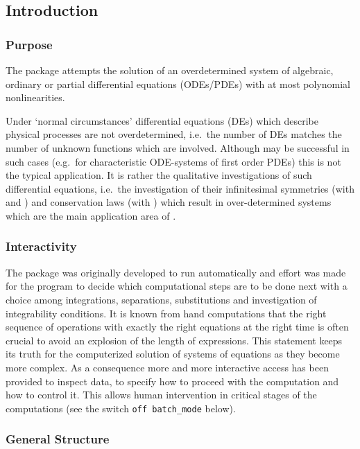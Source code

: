 \subsection{Introduction}

\subsubsection{Purpose}

The package  attempts the solution of an overdetermined
system of algebraic, ordinary or partial differential equations
(ODEs/PDEs) with at most polynomial nonlinearities.

Under `normal circumstances' differential equations (DEs) which
describe physical processes are not overdetermined, i.e.\ the number
of DEs matches the number of unknown functions which are involved.
Although  may be successful in such cases (e.g.\ for
characteristic ODE-systems of first order PDEs) this is not the
typical application.  It is rather the qualitative investigations of
such differential equations, i.e.\ the investigation of their
infinitesimal symmetries (with  and
) and conservation laws (with )
which result in over-determined systems which are the main application
area of .

\subsubsection{Interactivity}

The package was originally developed to run automatically and effort
was made for the program to decide which computational steps are to be
done next with a choice among integrations, separations, substitutions
and investigation of integrability conditions.  It is known from hand
computations that the right sequence of operations with exactly the
right equations at the right time is often crucial to avoid an
explosion of the length of expressions.  This statement keeps its
truth for the computerized solution of systems of equations as they
become more complex.  As a consequence more and more interactive
access has been provided to inspect data, to specify how to proceed
with the computation and how to control it.  This allows human
intervention in critical stages of the computations (see the switch
\texttt{off batch\_mode} below).

\subsubsection{General Structure}

